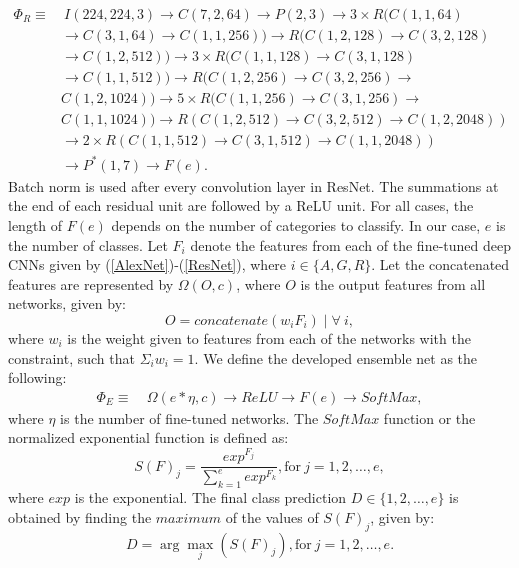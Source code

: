 \documentclass[journal]{IEEEtran}%
\begin{document}
{\tiny
\begin{equation}\label{ResNet}
\begin{aligned}
\Phi_R \equiv & ~I(224,224,3) \longrightarrow C(7,2,64) \longrightarrow P(2,3) \longrightarrow 3 \times R(C(1,1,64) \\
& \longrightarrow C(3,1,64) \longrightarrow C(1,1,256)) \longrightarrow R(C(1,2,128) \longrightarrow C(3,2,128) \\
& \longrightarrow C(1,2,512)) \longrightarrow 3 \times R(C(1,1,128) \longrightarrow C(3,1,128) \\
& \longrightarrow C(1,1,512)) \longrightarrow R(C(1,2,256) \longrightarrow C(3,2,256) \longrightarrow \\
& C(1,2,1024)) \longrightarrow 5\times R(C(1,1,256) \longrightarrow C(3,1,256) \longrightarrow \\
& C(1,1,1024)) \longrightarrow R(C(1,2,512) \longrightarrow C(3,2,512) \longrightarrow C(1,2,2048)) \\
& \longrightarrow 2\times R(C(1,1,512) \longrightarrow C(3,1,512) \longrightarrow C(1,1,2048)) \\
& \longrightarrow P^*(1,7) \longrightarrow F(e).
\end{aligned}
\end{equation}
}
Batch norm is used after every convolution layer in ResNet. The summations at the end of each residual unit are followed by a ReLU unit. For all cases, the length of $F(e)$ depends on the number of categories to classify. In our case, $e$ is the number of classes. Let $F_i$ denote the features from each of the fine-tuned deep CNNs given by (\ref{AlexNet})-(\ref{ResNet}), where $i\in\{A, G, R\}$. Let the concatenated features are represented by $\Omega(O,c)$, where $O$ is the output features from all networks, given by:
\begin{equation}\label{EnsembleNet}
O=concatenate(w_i F_i)\mid \forall~i,
\end{equation}
where $w_i$ is the weight given to features from each of the networks with the constraint, such that $\Sigma_i w_i = 1$. We define the developed ensemble net as the following:
\begin{equation}\label{EnsembleNet}
\begin{aligned}
\Phi_E \equiv & ~\Omega(e*\eta,c) \longrightarrow ReLU \longrightarrow F(e) \longrightarrow SoftMax,
\end{aligned}
\end{equation}
where $\eta$ is the number of fine-tuned networks. The $SoftMax$ function or the normalized exponential function is defined as:
\begin{equation}\label{SoftMax}
S(F)_j=\frac{exp^{F_j}}{\sum_{k=1}^e exp^{F_k}}, \text{for}~ j=1, 2, \ldots, e,
\end{equation}
where $exp$ is the exponential. The final class prediction $D\in\{1, 2, \ldots, e\}$ is obtained by finding the $maximum$ of the values of $S(F)_j$, given by:
\begin{equation}\label{classPredict}
D=\arg\max_j(S(F)_j), \text{for}~ j=1, 2, \ldots, e.
\end{equation}
\end{document}

